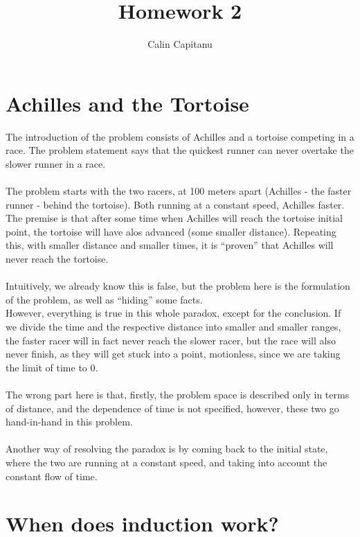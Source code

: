 \documentclass[english]{report}
\begin{document}
\title{Homework 2}
\author{Calin Capitanu}

\maketitle

\clearpage
\chapter{Achilles and the Tortoise}

The introduction of the problem consists of Achilles and a tortoise competing in a race. The problem statement says that the quickest runner can never overtake the slower runner in a race.
\\\\
The problem starts with the two racers, at 100 meters apart (Achilles - the faster runner - behind the tortoise). Both running at a constant speed, Achilles faster. The premise is that after some time when Achilles will reach the tortoise initial point, the tortoise will have alos advanced (some smaller distance). Repeating this, with smaller distance and smaller times, it is ``proven'' that Achilles will never reach the tortoise.
\\\\
Intuitively, we already know this is false, but the problem here is the formulation of the problem, as well as ``hiding'' some facts.
\\
However, everything is true in this whole paradox, except for the conclusion. If we divide the time and the respective distance into smaller and smaller ranges, the faster racer will in fact never reach the slower racer, but the race will also never finish, as they will get stuck into a point, motionless, since we are taking the limit of time to 0.
\\\\
The wrong part here is that, firstly, the problem space is described only in terms of distance, and the dependence of time is not specified, however, these two go hand-in-hand in this problem.
\\\\
Another way of resolving the paradox is by coming back to the initial state, where the two are running at a constant speed, and taking into account the constant flow of time.

\clearpage
\chapter{When does induction work?}
\end{document}
